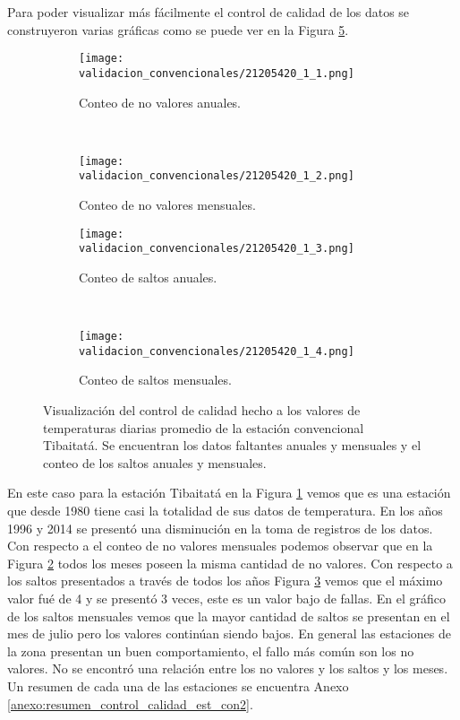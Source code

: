 Para poder visualizar más fácilmente el control de calidad de los datos se construyeron varias gráficas como se puede ver en la Figura \ref{gra:faltantes_saltos}.

\begin{figure}[H]
	\centering
	\begin{subfigure}[normla]{0.4\textwidth}
	\texttt{[image: validacion\_convencionales/21205420\_1\_1.png]}
		\caption{Conteo de no valores anuales.}
		\label{subfig:f1}
		\end{subfigure}
		~
    \begin{subfigure}[normla]{0.4\textwidth}
	\texttt{[image: validacion\_convencionales/21205420\_1\_2.png]}
		\caption{Conteo de no valores mensuales.}
		\label{subfig:f2}
		\end{subfigure}
		
    \begin{subfigure}[normla]{0.4\textwidth}
	\texttt{[image: validacion\_convencionales/21205420\_1\_3.png]}
		\caption{Conteo de saltos anuales.}
		\label{subfig:f3}
		\end{subfigure}
		~
    \begin{subfigure}[normla]{0.4\textwidth}
	\texttt{[image: validacion\_convencionales/21205420\_1\_4.png]}
		\caption{Conteo de saltos mensuales.}
		\label{subfig:f4}
		\end{subfigure}

	
	\caption{Visualización del control de calidad hecho a los valores de temperaturas diarias promedio de la estación convencional Tibaitatá. Se encuentran los datos faltantes anuales y mensuales y el conteo de los saltos anuales y mensuales.}
	\label{gra:faltantes_saltos}	
\end{figure}

En este caso para la estación Tibaitatá en la Figura \ref{subfig:f1} vemos que es una estación que desde 1980 tiene casi la totalidad de sus datos de temperatura. En los años 1996 y 2014 se presentó una disminución en la toma de registros de los datos. Con respecto a el conteo de no valores mensuales podemos observar que en la Figura \ref{subfig:f2} todos los meses poseen la misma cantidad de no valores. Con respecto a los saltos presentados a través de todos los años Figura \ref{subfig:f3} vemos que el máximo valor fué de 4 y se presentó 3 veces, este es un valor bajo de fallas. En el gráfico de los saltos mensuales vemos que la mayor cantidad de saltos se presentan en el mes de julio pero los valores continúan siendo bajos. En general las estaciones de la zona presentan un buen comportamiento, el fallo más común son los no valores. No se encontró una relación entre los no valores y los saltos y los meses. Un resumen de cada una de las estaciones se encuentra Anexo \ref{anexo:resumen_control_calidad_est_con2}.

